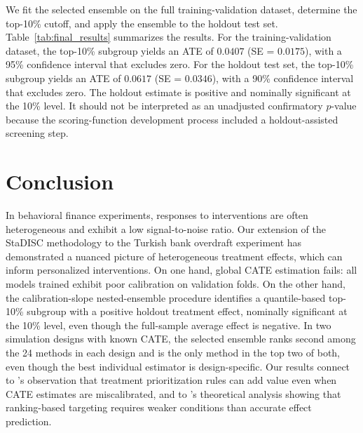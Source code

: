 \documentclass[12pt]{article}
\newcommand{\TargetFrac}{10{\%}\xspace}
\newcommand{\MainTVATE}{0.0407}
\newcommand{\MainTVSE}{0.0175}
\newcommand{\MainHOATE}{0.0617}
\newcommand{\MainHOSE}{0.0346}
\begin{document}
We fit the selected ensemble on the full training-validation dataset, determine the top-\TargetFrac cutoff, and apply the ensemble to the holdout test set. Table~\ref{tab:final_results} summarizes the results. For the training-validation dataset, the top-\TargetFrac subgroup yields an ATE of $\MainTVATE$ (SE = $\MainTVSE$), with a 95{\%} confidence interval that excludes zero. For the holdout test set, the top-\TargetFrac subgroup yields an ATE of $\MainHOATE$ (SE = $\MainHOSE$), with a 90{\%} confidence interval that excludes zero. The holdout estimate is positive and nominally significant at the 10{\%} level. It should not be interpreted as an unadjusted confirmatory $p$-value because the scoring-function development process included a holdout-assisted screening step.

\begingroup{}

\endgroup

\section{Conclusion}
\label{sec:conclusion}

In behavioral finance experiments, responses to interventions are often heterogeneous and exhibit a low signal-to-noise ratio. Our extension of the StaDISC methodology to the Turkish bank overdraft experiment has demonstrated a nuanced picture of heterogeneous treatment effects, which can inform personalized interventions. On one hand, global CATE estimation fails: all models trained exhibit poor calibration on validation folds. On the other hand, the calibration-slope nested-ensemble procedure identifies a quantile-based top-\TargetFrac subgroup with a positive holdout treatment effect, nominally significant at the 10{\%} level, even though the full-sample average effect is negative. In two simulation designs with known CATE, the selected ensemble ranks second among the 24 methods in each design and is the only method in the top two of both, even though the best individual estimator is design-specific. Our results connect to \citet{yadlowsky2025}'s observation that treatment prioritization rules can add value even when CATE estimates are miscalibrated, and to \citet{fernandez2022}'s theoretical analysis showing that ranking-based targeting requires weaker conditions than accurate effect prediction.
\end{document}
